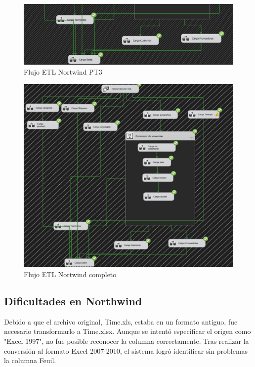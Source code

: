 \documentclass[12pt, a4paper, twoside]{article}
\begin{document}
	\begin{figure}[h!]
		\centering
		\includegraphics[width=1\textwidth]{image/flujo_north_3.png}
		\caption{Flujo ETL Nortwind PT3}
		\label{fig:7}
	\end{figure}
	
	
	\begin{figure}[h!]
		\centering
		\includegraphics[width=1\textwidth]{image/flujo_north_completo.png}
		\caption{Flujo ETL Nortwind completo}
		\label{fig:8}
	\end{figure}
	
	\vspace{3cm}
	
	\subsection{Dificultades en Northwind}
	
	Debido a que el archivo original, Time.xls, estaba en un formato antiguo, fue necesario transformarlo a Time.xlsx. Aunque se intentó especificar el origen como "Excel 1997", no fue posible reconocer la columna correctamente. Tras realizar la conversión al formato Excel 2007-2010, el sistema logró identificar sin problemas la columna Feuil.
	
\end{document}
